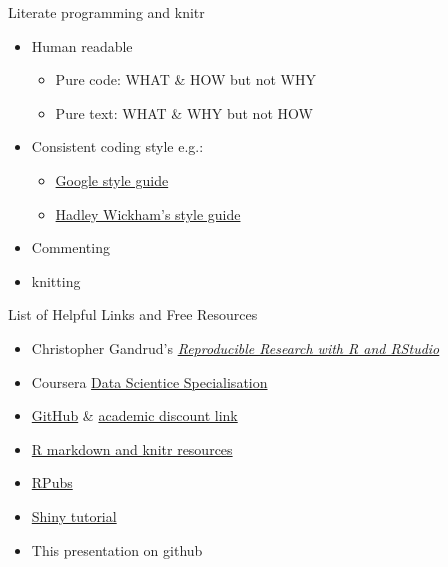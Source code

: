 \documentclass[handout]{beamer}
\begin{document}
\begin{frame}{Literate programming and knitr}
\begin{itemize}
	\item<1->{Human readable}
	\begin{itemize}
		\item<2->{Pure code: WHAT \& HOW but not WHY}
		\vspace{2ex}
		\item<2->{Pure text: WHAT \& WHY but not HOW}
		\vspace{2ex}
	\end{itemize}
	\item<3->Consistent coding style e.g.:
	\begin{itemize}
	 	\item<3-> \href{https://google.github.io/styleguide/Rguide.xml}{Google style guide}
		\item<3-> \href{http://adv-r.had.co.nz/Style.html}{Hadley Wickham's style guide}
	\end{itemize}
	\vspace{2ex}
	\item<5->{Commenting}
	\vspace{2ex}
	\item<6->{knitting}
\end{itemize}
\end{frame}

\begin{frame}{List of Helpful Links and Free Resources}
\begin{itemize}
\item Christopher Gandrud's \href{https://github.com/christophergandrud/Rep-Res-Book}{\emph{Reproducible Research with R and RStudio}}
\item Coursera \href{https://www.coursera.org/specializations/jhudatascience?utm_medium=courseDescripTop}{Data Scientice Specialisation}
\item \href{https://github.com/}{GitHub} \& \href{https://education.github.com/discount_requests/new}{academic discount link}
\item \href{http://rmarkdown.rstudio.com/}{R markdown and knitr resources}
\item \href{https://rpubs.com/}{RPubs}
\item \href{http://shiny.rstudio.com/tutorial/}{Shiny tutorial}
\item This presentation on github

\end{itemize}
\end{frame}
\end{document}
